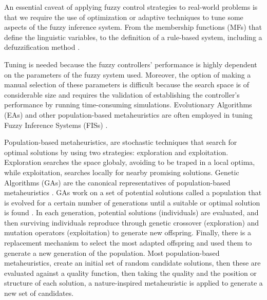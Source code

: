 \documentclass[symmetry,article,submit,moreauthors,pdftex]{Definitions/mdpi}
\begin{document}
An essential caveat of applying fuzzy control strategies to real-world problems
is that we require the use of optimization or adaptive techniques to tune some
aspects of the fuzzy inference system.  From the membership functions (MFs)
that define the linguistic variables, to the definition of a rule-based
system, including a defuzzification method
\cite{xia2019command,isaka1988design}. 

Tuning is needed because the fuzzy controllers' performance is highly dependent
on the parameters of the fuzzy system used. Moreover, the option of making a
manual selection of these parameters is difficult because the search space is
of considerable size and requires the validation of establishing the
controller's performance by running time-consuming simulations.  Evolutionary
Algorithms (EAs) and other population-based metaheuristics are often employed in tuning 
Fuzzy Inference Systems (FISs) %
\cite{martinez-soto_bio-inspired_2012,DBLP:conf/evoW/SalemMGG18}.

Population-based metaheuristics, are stochastic techniques that search for
optimal solutions by using two strategies: exploration and exploitation.
Exploration searches the space globaly, avoiding to be traped in a local
optima, while exploitation, searches locally for nearby promising solutions.
Genetic Algorithms (GAs) are the canonical representatives of population-based
metaheuristics \cite{holland1992genetic}.  GAs work on a set of potential
solutions called a population that is evolved for a certain number of
generations until a suitable or optimal solution is found
\cite{muelas_algoritmos_2009}.  In each generation, potential solutions
(individuals) are evaluated, and then surviving individuals reproduce through
genetic crossover (exploration) and mutation operators (exploitation) to
generate new offspring.  Finally, there is a replacement mechanism to select
the most adapted offspring and used them to generate a new generation of the
population.  Most population-based metaheuristics, create an initial set of
random candidate solutions, then these are evaluated against a quality
function, then taking the quality and the position or structure of each
solution, a nature-inspired metaheuristic is applied to generate a new set of
candidates. 
\end{document}
